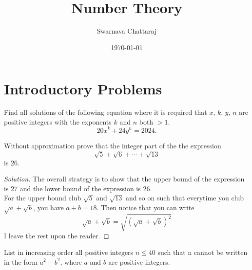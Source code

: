 \documentclass{scrartcl} %
\title{Number Theory}
\author{Swarnava Chattaraj}
\date{\today}
\begin{document}
\maketitle

\section{Introductory Problems} %


\begin{example}
   Find all solutions of the following equation where it is required that
$x$, $k$, $y$, $n$ are positive integers with the exponents $k$ and $n$ both $> 1$.
\[20x^k + 24y^n = 2024.\]
\end{example}

\begin{example}
Without approximation prove that the integer part of the the expression 
\[
	\sqrt{5} + \sqrt{6} + \cdots + \sqrt{13}
\]
is $26$.
\end{example}
\begin{proof}[Solution]
	The overall strategy is to show that the upper bound of the expression is $27$ and the lower bound of the expression is $26$.\\
	For the upper bound club $\sqrt{5}$ and $\sqrt{13}$ and so on such that everytime you club $\sqrt{a} + \sqrt{b}$, you have $a + b = 18$. Then notice that you can write
	\[
		\sqrt{a} + \sqrt{b} = \sqrt{\left(\sqrt{a}+\sqrt{b}\right)^2}
	\]
	I leave the rest upon the reader.
\end{proof}
\newpage
\begin{example}[CMI A5, 2018]
	List in increasing order all positive integers $n \leq 40$ such that n cannot be written in the form $a^2 - b^2$, where $a$ and $b$ are positive integers.

\end{example}
\end{document}
